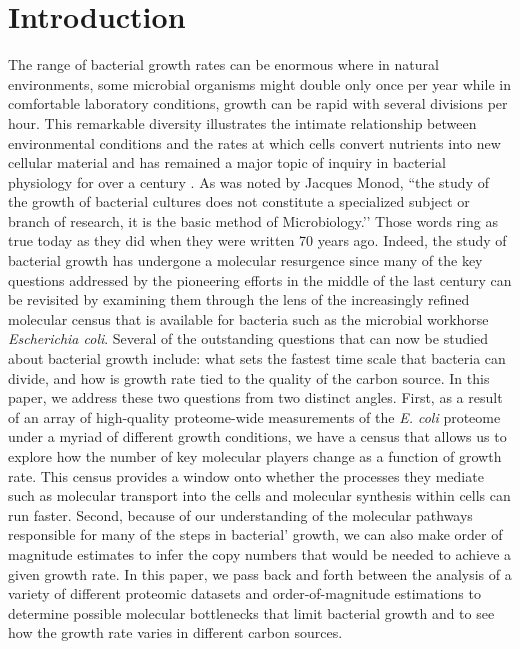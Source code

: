 

\section{Introduction}
The range of bacterial growth rates can be enormous where in natural environments,
some microbial organisms might double only once per year while in
comfortable laboratory conditions, growth can be rapid with several divisions
per hour. This remarkable diversity illustrates the intimate relationship
between environmental conditions and the rates at which cells convert
nutrients into new cellular material and has remained a major topic of inquiry in
bacterial physiology for over a century \citep{jun2018}. As was noted by
Jacques Monod, ``the study of the growth of bacterial cultures does not
constitute a specialized subject or branch of research, it is the basic
method of Microbiology.’’ Those words ring as true today as they did when
they were written 70 years ago. Indeed, the study of bacterial growth has
undergone a molecular resurgence since many of the key questions addressed by
the pioneering efforts in the middle of the last century can be revisited by
examining them through the lens of the increasingly refined molecular census
that is available for bacteria such as the microbial workhorse \textit{Escherichia coli}.
Several of the outstanding questions that can now be studied about bacterial
growth include: what sets the fastest time scale that bacteria can divide,
and how is growth rate tied to the quality of the carbon source. In this
paper, we address these two questions from two distinct angles. First, as a
result of an array of high-quality proteome-wide measurements of the
\textit{E. coli} proteome under a myriad of different growth conditions, we
have a census that allows us to explore how the number of key molecular
players change as a function of growth rate. This census provides a window
onto whether the processes they mediate such as molecular transport into the
cells and molecular synthesis within cells can run faster. Second, because of
our understanding of the molecular pathways responsible for many of the steps
in bacterial’ growth, we can also make order of magnitude estimates to infer
the copy numbers that would be needed to achieve a given growth rate. In this
paper, we pass back and forth between the analysis of a variety of different
proteomic datasets and order-of-magnitude estimations to determine possible
molecular bottlenecks that limit bacterial growth and to see how the growth
rate varies in different carbon sources.

